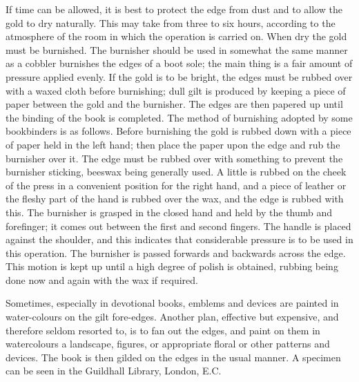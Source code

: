 \documentclass[twoside]{book}
\begin{document}
If time can be allowed, it is best to protect the
\pagebreak
edge from dust and to allow the gold to dry
naturally. This may take from three to six hours,
according to the atmosphere of the room in which
the operation is carried on. When dry the gold
must be burnished. The burnisher should be used
in somewhat the same manner as a cobbler burnishes
the edges of a boot sole; the main thing is
a fair amount of pressure applied evenly. If the
gold is to be bright, the edges must be rubbed over
with a waxed cloth before burnishing; dull gilt is
produced by keeping a piece of paper between
the gold and the burnisher. The edges are then
papered up until the binding of the book is completed.
The method of burnishing adopted by some
bookbinders is as follows. Before burnishing the
gold is rubbed down with a piece of paper held in
the left hand; then place the paper upon the edge
and rub the burnisher over it. The edge must be
rubbed over with something to prevent the burnisher
sticking, beeswax being generally used. A
little is rubbed on the cheek of the press in a
convenient position for the right hand, and a piece of
leather or the fleshy part of the hand is rubbed
over the wax, and the edge is rubbed with this.
The burnisher is grasped in the closed hand and
held by the thumb and forefinger; it comes out
between the first and second fingers. The handle
is placed against the shoulder, and this indicates
that considerable pressure is to be used in this
operation. The burnisher is passed forwards and
backwards across the edge. This motion is kept
up until a high degree of polish is obtained,
rubbing being done now and again with the wax if
required.

Sometimes, especially in devotional books, emblems
and devices are painted in water-colours on the
gilt fore-edges. Another plan, effective but
expensive, and therefore seldom resorted to, is to
\pagebreak
fan out the edges, and paint on them in watercolours
a landscape, figures, or appropriate floral or
other patterns and devices. The book is then
gilded on the edges in the usual manner. A specimen
can be seen in the Guildhall Library, London,
E.C.
\end{document}
